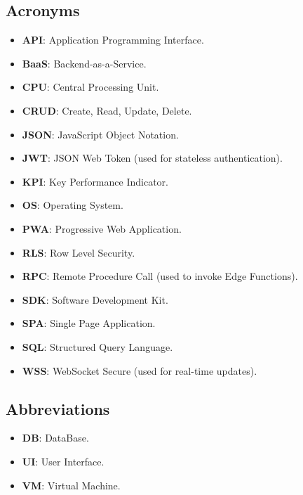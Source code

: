 \subsection{Acronyms}
\begin{itemize}
    \item \textbf{API}: Application Programming Interface.
    \item \textbf{BaaS}: Backend-as-a-Service.
    \item \textbf{CPU}: Central Processing Unit.
    \item \textbf{CRUD}: Create, Read, Update, Delete.
    \item \textbf{JSON}: JavaScript Object Notation.
    \item \textbf{JWT}: JSON Web Token (used for stateless authentication).
    \item \textbf{KPI}: Key Performance Indicator.
    \item \textbf{OS}: Operating System.
    \item \textbf{PWA}: Progressive Web Application.
    \item \textbf{RLS}: Row Level Security.
    \item \textbf{RPC}: Remote Procedure Call (used to invoke Edge Functions).
    \item \textbf{SDK}: Software Development Kit.
    \item \textbf{SPA}: Single Page Application.
    \item \textbf{SQL}: Structured Query Language.
    \item \textbf{WSS}: WebSocket Secure (used for real-time updates).
\end{itemize}

\subsection{Abbreviations}
\begin{itemize}
    \item \textbf{DB}: DataBase.
    \item \textbf{UI}: User Interface.
    \item \textbf{VM}: Virtual Machine.
\end{itemize}


